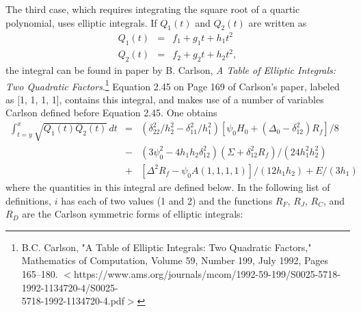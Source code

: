 \documentclass[12pt]{article}
\begin{document}
The third case, which requires integrating the square root of
a quartic polynomial, uses elliptic integrals. If $Q_1(t)$ and
$Q_2(t)$ are written as
\begin{eqnarray*}
Q_1(t) & = & f_1 + g_1t+h_1t^2 \\
Q_2(t) & = & f_2 + g_2t + h_2t^2 ,
\end{eqnarray*}
the integral can be found in paper by B. Carlson,
\emph{A Table of Elliptic Integrals: Two Quadratic Factors}.\footnote{
  B.C. Carlson,
  "A Table of Elliptic Integrals: Two Quadratic Factors,"
  Mathematics of Computation, Volume 59, Number 199, July 1992,
  Pages 165--180.
  $<$https://www.ams.org/journals/mcom/1992-59-199/S0025-5718-1992-1134720-4/S0025-\\
5718-1992-1134720-4.pdf$>$
}
Equation 2.45 on Page 169 of Carlson's paper, labeled as
[1, 1, 1, 1], contains this integral, and makes use of a number of
variables Carlson defined before Equation 2.45. One obtains
\begin{eqnarray*}
\int_{t=y}^{x}\sqrt{Q_1(t)Q_2(t)}\,dt & = &
     (\delta^2_{22}/h_2^2 - \delta_{11}^2/h_1^2)[\psi_0H_0
     + (\Delta_0 - \delta_{12}^2)R_f]/8 \\
& - & (3\psi_0^2-4h_1h_2\delta_{12}^2)(\Sigma+\delta_{12}^2R_f)
  / (24h_1^2h_2^2) \\
& + &  [\Delta^2R_f-\psi_0A(1,1,1,1)]/(12h_1h_2) + E/(3h_1)
\end{eqnarray*}
where the quantities in this integral are defined below. In the following
list of definitions, $i$ has each of two values (1 and 2) and the
functions $R_F$, $R_J$, $R_C$, and $R_D$ are the Carlson symmetric
forms of elliptic integrals:
\end{document}
